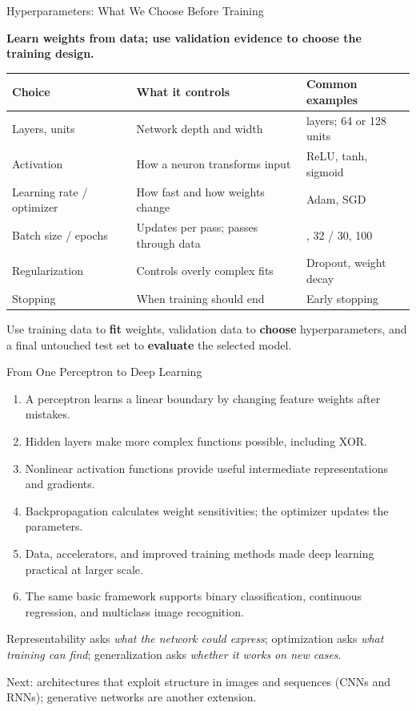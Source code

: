 \documentclass[aspectratio=169,10pt]{beamer}
\newcommand{\conceptlead}[1]{{\small\bfseries\color{CalPolyGreen}#1\par}}
\begin{document}
\begin{frame}[t]{Hyperparameters: What We Choose Before Training}
\small
\conceptlead{Learn weights from data; use validation evidence to choose the training design.}
\begin{center}
\renewcommand{\arraystretch}{1.13}
\begin{tabular}{>{\raggedright\arraybackslash}p{.26\linewidth}>{\raggedright\arraybackslash}p{.34\linewidth}>{\raggedright\arraybackslash}p{.30\linewidth}}
\toprule
\textbf{Choice} & \textbf{What it controls} & \textbf{Common examples}\\
\midrule
Layers, units & Network depth and width & 2 layers; 64 or 128 units\\
Activation & How a neuron transforms input & ReLU, tanh, sigmoid\\
Learning rate / optimizer & How fast and how weights change & Adam, SGD\\
Batch size / epochs & Updates per pass; passes through data & 16, 32 / 30, 100\\
Regularization & Controls overly complex fits & Dropout, weight decay\\
Stopping & When training should end & Early stopping\\
\bottomrule
\end{tabular}
\end{center}
\begin{keyidea}Use training data to \textbf{fit} weights, validation data to \textbf{choose} hyperparameters, and a final untouched test set to \textbf{evaluate} the selected model.\end{keyidea}
\end{frame}

\begin{frame}[t]{From One Perceptron to Deep Learning}
\small
\begin{enumerate}
 \item A perceptron learns a linear boundary by changing feature weights after mistakes.
 \item Hidden layers make more complex functions possible, including XOR.
 \item Nonlinear activation functions provide useful intermediate representations and gradients.
 \item Backpropagation calculates weight sensitivities; the optimizer updates the parameters.
 \item Data, accelerators, and improved training methods made deep learning practical at larger scale.
 \item The same basic framework supports binary classification, continuous regression, and multiclass image recognition.
\end{enumerate}
\begin{keyidea}Representability asks \emph{what the network could express}; optimization asks \emph{what training can find}; generalization asks \emph{whether it works on new cases}.\end{keyidea}
\smallskip
\centering\scriptsize Next: architectures that exploit structure in images and sequences (CNNs and RNNs); generative networks are another extension.
\end{frame}
\end{document}
